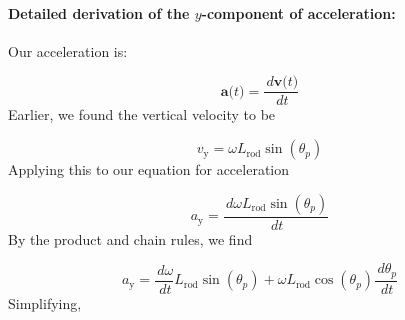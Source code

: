 \documentclass[12pt]{article}
\begin{document}
\paragraph{Detailed derivation of the $y$-component of acceleration:}
\label{GD:accelerationIYDeriv}
Our acceleration is:

\begin{displaymath}
\symbf{a}\text{(}t\text{)}=\frac{\,d\symbf{v}\text{(}t\text{)}}{\,dt}
\end{displaymath}
Earlier, we found the vertical velocity to be

\begin{displaymath}
{v_{\text{y}}}=ω {L_{\text{rod}}} \sin\left({θ_{p}}\right)
\end{displaymath}
Applying this to our equation for acceleration

\begin{displaymath}
{a_{\text{y}}}=\frac{\,dω {L_{\text{rod}}} \sin\left({θ_{p}}\right)}{\,dt}
\end{displaymath}
By the product and chain rules, we find

\begin{displaymath}
{a_{\text{y}}}=\frac{\,dω}{\,dt} {L_{\text{rod}}} \sin\left({θ_{p}}\right)+ω {L_{\text{rod}}} \cos\left({θ_{p}}\right) \frac{\,d{θ_{p}}}{\,dt}
\end{displaymath}
Simplifying,
\end{document}
